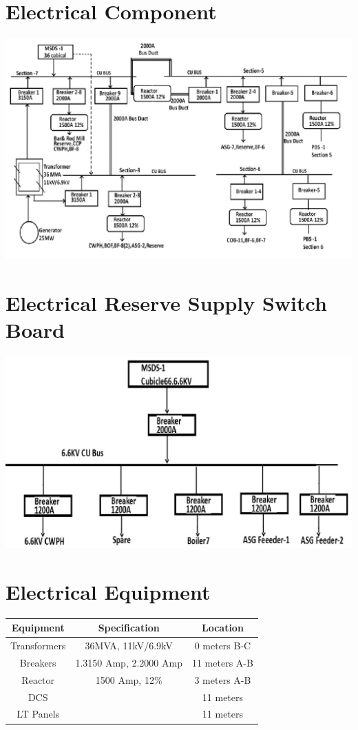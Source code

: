 \documentclass[english,11pt]{report}
\begin{document}
\section{Electrical Component}
\includegraphics[width =6in]{stg25mw}

\section{Electrical Reserve Supply Switch Board}
\includegraphics[width =6in]{stgelec} 

\section{Electrical Equipment}
\begin{center}
\begin{tabular} { | c | c | c |} 
\hline
Equipment & Specification & Location \\ \hline
Transformers & 36MVA, 11kV/6.9kV & 0 meters B-C \\ \hline
Breakers & 1.3150 Amp, 2.2000 Amp & 11 meters A-B \\ \hline
Reactor & 1500 Amp, 12\% & 3 meters A-B \\ \hline
DCS &  & 11 meters \\ \hline
LT Panels & & 11 meters\\  
\hline
\end{tabular}
\end{center}  
\end{document}
